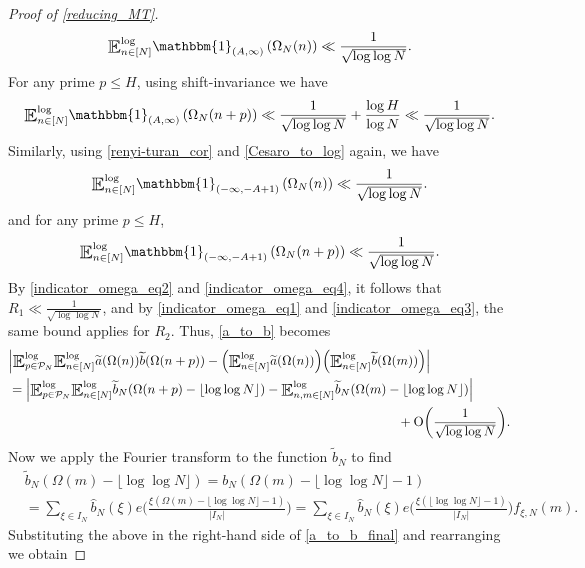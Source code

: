 \documentclass[letter,11pt]{article}
\theoremstyle{plain} %
\theoremstyle{definition} %
\theoremstyle{plain}
\theoremstyle{plain}
\theoremstyle{plain}
\numberwithin{equation}{section}
\newcommand{\Oh}{{\mathrm O}}
\renewcommand{\leq}{\leqslant}
\newcommand{\E}{\raisebox{-0.4ex}{\scalebox{1.4}[1.3]{$\mathbb{E}$}}}
\newcommand{\logE}{{\E}^{\log}}
\newcommand{\1}{\mathbbm{1}}
\newcommand{\f}{f_{\xi,N}}
\newcommand{\Pc}{\mathcal{P}}
\begin{document}
\begin{proof}[Proof of \cref{reducing_MT}]
\begin{equation}\label{indicator_omega_eq1}
    \logE_{n\in[N]} \1_{(A,\infty)}\left(\Omega_N(n)\right) 
    \ll \frac{1}{\sqrt{\log\log{N}}}.
\end{equation}
For any prime $p\leq H$, using shift-invariance we have
\begin{equation}\label{indicator_omega_eq2}
    \logE_{n\in[N]}\1_{(A,\infty)}\left(\Omega_N(n+p)\right)
    \ll \frac{1}{\sqrt{\log\log{N}}} + \frac{\log{H}}{\log{N}}
    \ll \frac{1}{\sqrt{\log\log{N}}}.
\end{equation}
Similarly, using \cref{renyi-turan_cor} and \cref{Cesaro_to_log} again, we have 
\begin{equation}\label{indicator_omega_eq3}
    \logE_{n\in[N]} \1_{(-\infty,-A+1)}\left(\Omega_N(n)\right) 
    \ll \frac{1}{\sqrt{\log\log{N}}}.
\end{equation}
and for any prime $p\leq H$,
\begin{equation}\label{indicator_omega_eq4}
\logE_{n\in[N]}\1_{(-\infty,-A+1)}\left(\Omega_N(n+p)\right) 
\ll \frac{1}{\sqrt{\log\log{N}}}.
\end{equation}
By \eqref{indicator_omega_eq2} and \eqref{indicator_omega_eq4}, it follows that $R_1\ll\frac{1}{\sqrt{\log\log{N}}}$, 
and by \eqref{indicator_omega_eq1} and \eqref{indicator_omega_eq3}, the same bound applies for $R_2$.
Thus, \eqref{a_to_b} becomes
\begin{align}\label{a_to_b_final}
    & \Big|\logE_{p\in\Pc_N}\logE_{n\in[N]}\widetilde{a}(\Omega(n))\widetilde{b}(\Omega(n+p)) - \Big(\logE_{n\in[N]}\widetilde{a}(\Omega(n))\Big)\Big(\logE_{n\in[N]}\widetilde{b}(\Omega(m))\Big)\Big| \notag \\
    & = \Big|\logE_{p\in\Pc_N}\logE_{n\in[N]}\widetilde{b}_N(\Omega(n+p)-\lfloor\log\log{N}\rfloor) - \logE_{n,m\in[N]}\widetilde{b}_N(\Omega(m)-\lfloor\log\log{N}\rfloor)\Big| \notag \\
    & \hspace*{10.5cm}  
    + \Oh\bigg(\frac{1}{\sqrt{\log\log{N}}}\bigg).
\end{align}
Now we apply the Fourier transform to the function $\widetilde{b}_N$ to find
\begin{align*}
    &\widetilde{b}_N(\Omega(m)-\lfloor\log\log{N}\rfloor)
    = b_N(\Omega(m)-\lfloor\log\log{N}\rfloor-1) \\
    & =\sum_{\xi\in I_N}\widehat{b}_N(\xi)e\bigg(\frac{\xi\left(\Omega(m)-\lfloor\log\log{N}\rfloor-1\right)}{|I_N|}\bigg) 
    = \sum_{\xi\in I_N}\widehat{b}_N(\xi)e\bigg(\frac{\xi\left(\lfloor\log\log{N}\rfloor-1\right)}{|I_N|}\bigg)\f(m).
\end{align*}
Substituting the above in the right-hand side of \eqref{a_to_b_final} and rearranging we obtain


\end{proof}
\end{document}
